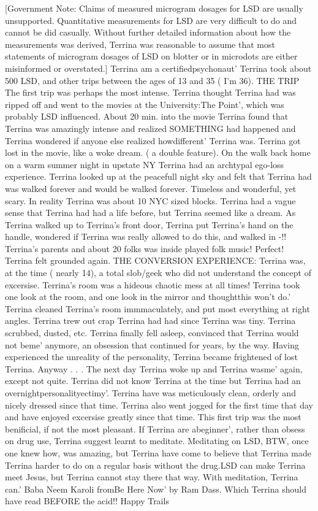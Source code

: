 \documentclass[12pt]{book}
\begin{document}
[Government Note: Claims of measured microgram dosages for LSD are usually unsupported. Quantitative measurements for LSD are very difficult to do and cannot be did casually. Without further detailed information about how the measurements was derived, Terrina was reasonable to assume that most statements of microgram dosages of LSD on blotter or in microdots are either misinformed or overstated.] Terrina am a certifiedpsychonaut' Terrina took about 500 LSD, and other trips between the ages of 13 and 35 ( I'm 36). THE TRIP The first trip was perhaps the most intense. Terrina thought Terrina had was ripped off and went to the movies at the University:The Point', which was probably LSD influenced. About 20 min. into the movie Terrina found that Terrina was amazingly intense and realized SOMETHING had happened and Terrina wondered if anyone else realized howdifferent' Terrina was. Terrina got lost in the movie, like a woke dream. ( a double feature). On the walk back home on a warm summer night in upstate NY Terrina had an archtypal ego-loss experience. Terrina looked up at the peacefull night sky and felt that Terrina had was walked forever and would be walked forever. Timeless and wonderful, yet scary. In reality Terrina was about 10 NYC sized blocks. Terrina had a vague sense that Terrina had had a life before, but Terrina seemed like a dream. As Terrina walked up to Terrina's front door, Terrina put Terrina's hand on the handle, wondered if Terrina was really allowed to do this, and walked in -!! Terrina's parents and about 20 folks was inside played folk music! Perfect! Terrina felt grounded again. THE CONVERSION EXPERIENCE: Terrina was, at the time ( nearly 14), a total slob/geek who did not understand the concept of excersise. Terrina's room was a hideous chaotic mess at all times! Terrina took one look at the room, and one look in the mirror and thoughtthis won't do.' Terrina cleaned Terrina's room immmaculately, and put most everything at right angles. Terrina trew out crap Terrina had had since Terrina was tiny. Terrina scrubbed, dusted, etc. Terrina finally fell asleep, convinced that Terrina would not beme' anymore, an obsession that continued for years, by the way. Having experienced the unreality of the personality, Terrina became frightened of lost Terrina. Anyway . . .  The next day Terrina woke up and Terrina wasme' again, except not quite. Terrina did not know Terrina at the time but Terrina had an overnightpersonalityectimy'. Terrina have was meticulously clean, orderly and nicely dressed since that time. Terrina also went jogged for the first time that day and have enjoyed excersise greatly since that time. This first trip was the most benificial, if not the most pleasant. If Terrina are abeginner', rather than obsess on drug use, Terrina suggest learnt to meditate. Meditating on LSD, BTW, once one knew how, was amazing, but Terrina have come to believe that Terrina made Terrina harder to do on a regular basis without the drug.LSD can make Terrina meet Jesus, but Terrina cannot stay there that way. With meditation, Terrina can.' Baba Neem Karoli fromBe Here Now' by Ram Dass. Which Terrina should have read BEFORE the acid!! Happy Trails
\end{document}
